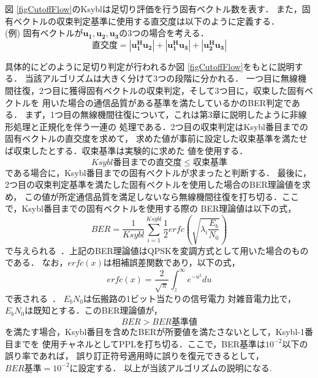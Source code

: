 図 \ref{figCutoffFlow}のKsyblは足切り評価を行う固有ベクトル数を表す．
また，固有ベクトルの収束判定基準に使用する直交度は以下のように定義する．\\
\vspace{5mm}
(例) \quad 固有ベクトルが$\bm{u_1,u_2,u_3}$の3つの場合を考える．
\begin{equation}
    直交度 = \left|\bm{u_1^Hu_2}\right|+\left|\bm{u_1^Hu_3}\right|+\left|\bm{u_2^Hu_3}\right|
\end{equation}

具体的にどのように足切り判定が行われるか図 \ref{figCutoffFlow}をもとに説明する．
当該アルゴリズムは大きく分けて3つの段階に分かれる．
一つ目に無線機間往復，2つ目に獲得固有ベクトルの収束判定，そして3つ目に，収束した固有ベクトルを
用いた場合の通信品質がある基準を満たしているかのBER判定である．
まず，1つ目の無線機間往復について，これは第3章に説明したように非線形処理と正規化を伴う一連の
処理である．2つ目の収束判定はKsybl番目までの固有ベクトルの直交度を求めて，
求めた値が事前に設定した収束基準を満たせば収束したとする．収束基準は実験的に求めた
値を使用する．
\begin{equation}
    Ksybl番目までの直交度 \leq 収束基準
\end{equation}
である場合に，Ksybl番目までの固有ベクトルが求まったと判断する．
最後に，2つ目の収束判定基準を満たした固有ベクトルを使用した場合のBER理論値を求め，
この値が所定通信品質を満足しないなら無線機間往復を打ち切る．ここで，Ksybl番目までの固有ベクトルを使用する際の
BER理論値は以下の式，
\begin{equation}
    BER = \frac{1}{Ksybl}\sum_{i=1}^{Ksybl} \frac{1}{2}erfc\left( \sqrt{\lambda_i\frac{E_b}{N_0}} \right)
\end{equation}
で与えられる~\cite{akaiwa}．上記のBER理論値はQPSKを変調方式として用いた場合のものである．
なお，$erfc(x)$は相補誤差関数であり，以下の式，
\begin{equation}
    erfc(x) = \frac{2}{\sqrt{\pi}} \int_z^\infty e^{-u^2}du \nonumber
\end{equation}
で表される~\cite{takahata}．
$E_bN_0$は伝搬路の1ビット当たりの信号電力
対雑音電力比で，$E_bN_0$は既知とする．このBER理論値が，
\begin{equation}
    BER > BER基準値
\end{equation}
を満たす場合，Ksybl番目を含めたBERが所要値を満たさないとして，Ksybl-1番目までを
使用チャネルとしてPPLを打ち切る．ここで，BER基準は$10^{-2}$以下の誤り率であれば，
誤り訂正符号適用時に誤りを復元できるとして，$BER基準=10^{-2}$に設定する．
以上が当該アルゴリズムの説明になる.

